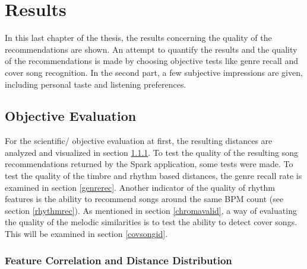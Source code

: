 
\chapter{Results}\label{bds2}

In this last chapter of the thesis, the results concerning the quality of the recommendations are shown. 
An attempt to quantify the results and the quality of the recommendations is made by choosing objective tests like genre recall and cover song recognition. In the second part, a few subjective impressions are given, including personal taste and listening preferences. 

\section{Objective Evaluation}

For the scientific/ objective evaluation at first, the resulting distances are analyzed and visualized in section \ref{featqual}.
To test the quality of the resulting song recommendations returned by the Spark application, some tests were made. To test the quality of the timbre and rhythm based distances, the genre recall rate is examined in section \ref{genrerec}. Another indicator of the quality of rhythm features is the ability to recommend songs around the same BPM count (see section \ref{rhythmrec}). 
As mentioned in section \ref{chromavalid}, a way of evaluating the quality of the melodic similarities is to test the ability to detect cover songs. This will be examined in section \ref{covsongid}. 

\subsection{Feature Correlation and Distance Distribution}\label{featqual}

